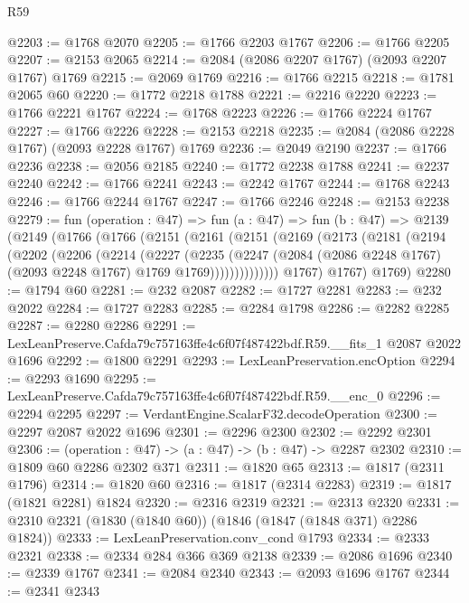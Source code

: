 \begin{lexlean}{R59}
\begin{coremodule}
@2203 := @1768 @2070
@2205 := @1766 @2203 @1767
@2206 := @1766 @2205
@2207 := @2153 @2065
@2214 := @2084 (@2086 @2207 @1767) (@2093 @2207 @1767) @1769
@2215 := @2069 @1769
@2216 := @1766 @2215
@2218 := @1781 @2065 @60
@2220 := @1772 @2218 @1788
@2221 := @2216 @2220
@2223 := @1766 @2221 @1767
@2224 := @1768 @2223
@2226 := @1766 @2224 @1767
@2227 := @1766 @2226
@2228 := @2153 @2218
@2235 := @2084 (@2086 @2228 @1767) (@2093 @2228 @1767) @1769
@2236 := @2049 @2190
@2237 := @1766 @2236
@2238 := @2056 @2185
@2240 := @1772 @2238 @1788
@2241 := @2237 @2240
@2242 := @1766 @2241
@2243 := @2242 @1767
@2244 := @1768 @2243
@2246 := @1766 @2244 @1767
@2247 := @1766 @2246
@2248 := @2153 @2238
@2279 := fun (operation : @47) =>
  fun (a : @47) =>
  fun (b : @47) =>
  @2139
    (@2149
      (@1766
        (@1766
          (@2151
            (@2161
              (@2151
                (@2169
                  (@2173
                    (@2181
                      (@2194
                        (@2202
                          (@2206
                            (@2214
                              (@2227
                                (@2235
                                  (@2247
                                    (@2084
                                      (@2086 @2248 @1767)
                                      (@2093 @2248 @1767)
                                      @1769
                                      @1769))))))))))))))
          @1767)
        @1767)
      @1769)
@2280 := @1794 @60
@2281 := @232 @2087
@2282 := @1727 @2281
@2283 := @232 @2022
@2284 := @1727 @2283
@2285 := @2284 @1798
@2286 := @2282 @2285
@2287 := @2280 @2286
@2291 := LexLeanPreserve.Cafda79c757163ffe4c6f07f487422bdf.R59.__fits_1 @2087 @2022 @1696
@2292 := @1800 @2291
@2293 := LexLeanPreservation.encOption
@2294 := @2293 @1690
@2295 := LexLeanPreserve.Cafda79c757163ffe4c6f07f487422bdf.R59.__enc_0
@2296 := @2294 @2295
@2297 := VerdantEngine.ScalarF32.decodeOperation
@2300 := @2297 @2087 @2022 @1696
@2301 := @2296 @2300
@2302 := @2292 @2301
@2306 := (operation : @47) -> (a : @47) -> (b : @47) -> @2287 @2302
@2310 := @1809 @60 @2286 @2302 @371
@2311 := @1820 @65
@2313 := @1817 (@2311 @1796)
@2314 := @1820 @60
@2316 := @1817 (@2314 @2283)
@2319 := @1817 (@1821 @2281) @1824
@2320 := @2316 @2319
@2321 := @2313 @2320
@2331 := @2310 @2321 (@1830 (@1840 @60)) (@1846 (@1847 (@1848 @371) @2286 @1824))
@2333 := LexLeanPreservation.conv_cond @1793
@2334 := @2333 @2321
@2338 := @2334 @284 @366 @369 @2138
@2339 := @2086 @1696
@2340 := @2339 @1767
@2341 := @2084 @2340
@2343 := @2093 @1696 @1767
@2344 := @2341 @2343

\end{coremodule}
\end{lexlean}
